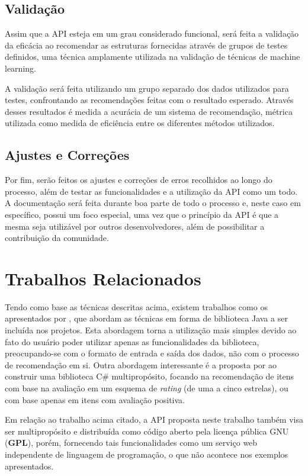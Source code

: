 \documentclass[12pt, openright, oneside, a4paper, brazil]{abntex2}
\begin{document}
\subsection{Validação}

Assim que a API esteja em um grau considerado funcional, será feita a validação da eficácia ao recomendar as estruturas fornecidas através de grupos de testes definidos, uma técnica amplamente utilizada na validação de técnicas de machine learning.

A validação será feita utilizando um grupo separado dos  dados utilizados para testes, confrontando as recomendações feitas com o resultado esperado. Através desses resultados é medida a acurácia de um sistema de recomendação, métrica utilizada como medida de eficiência entre os diferentes métodos utilizados.

\subsection{Ajustes e Correções}

Por fim, serão feitos os ajustes e correções de erros recolhidos ao longo do processo, além de testar as funcionalidades e a utilização da API como um todo. A documentação será feita durante boa parte de todo o processo e, neste caso em específico, possui um foco especial, uma vez que o princípio da API é que a mesma seja utilizável por outros desenvolvedores, além de possibilitar a contribuição da comunidade.

\section{Trabalhos Relacionados}

Tendo como base as técnicas descritas acima, existem trabalhos como os apresentados por , que abordam as técnicas em forma de biblioteca Java a ser incluída nos projetos. Esta abordagem torna a utilização mais simples devido ao fato do usuário poder utilizar apenas as funcionalidades da biblioteca, preocupando-se com o formato de entrada e saída dos dados, não com o processo de recomendação em si. Outra abordagem interessante é a proposta por  ao construir uma biblioteca C\# multipropósito, focando na recomendação de itens com base na avaliação em um esquema de \textit{rating} (de uma a cinco estrelas), ou com base apenas em itens com avaliação positiva.

Em relação ao trabalho acima citado, a API proposta neste trabalho também visa ser multipropósito e distribuída como código aberto pela licença pública GNU (\textbf{GPL}), porém, fornecendo tais funcionalidades como um serviço web independente de linguagem de programação, o que não acontece nos exemplos apresentados.
\end{document}
